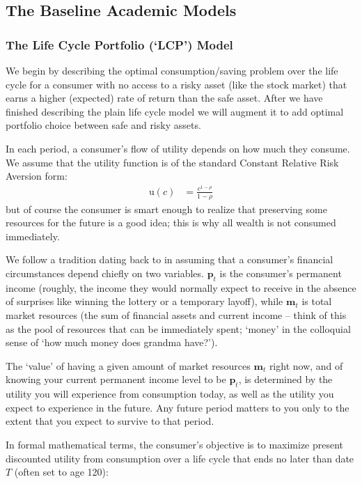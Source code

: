 \documentclass{article}
\newcommand{\CRRA}{\rho}
\newcommand{\uFunc}{\mathrm{u}}
\newcommand{\pLvl}{\mathbf{p}}
\newcommand{\mLvl}{\mathbf{m}}
\begin{document}
\subsection{The Baseline Academic Models}

\subsubsection{The Life Cycle Portfolio (`LCP') Model}

We begin by describing the optimal consumption/saving problem over the life cycle for a consumer with no access to a risky asset (like the stock market) that earns a higher (expected) rate of return than the safe asset. After we have finished describing the plain life cycle model we will augment it to add optimal portfolio choice between safe and risky assets.

In each period, a consumer's flow of utility depends on how much they consume. We assume that the utility function is of the standard Constant Relative Risk Aversion form:
\begin{align}
    \uFunc(c) & = \frac{c^{1-\CRRA}}{1-\CRRA}
\end{align}
but of course the consumer is smart enough to realize that preserving some resources for the future is a good idea; this is why all wealth is not consumed immediately.

We follow a tradition dating back to \cite{friedman1957} in assuming that a consumer's financial circumstances depend chiefly on two variables. $\pLvl_{t}$ is the consumer's permanent income (roughly, the income they would normally expect to receive in the absence of surprises like winning the lottery or a temporary layoff), while $\mLvl_{t}$ is total market resources (the sum of financial assets and current income -- think of this as the pool of resources that can be immediately spent; `money' in the colloquial sense of `how much money does grandma have?').

The `value' of having a given amount of market resources $\mLvl_{t}$ right now, and of knowing your current permanent income level to be $\pLvl_{t}$, is determined by the utility you will experience from consumption today, as well as the utility you expect to experience in the future. Any future period matters to you only to the extent that you expect to survive to that period.

In formal mathematical terms, the consumer's objective is to maximize present discounted utility from consumption over a life cycle that ends no later than date $T$ (often set to age 120):
\end{document}
